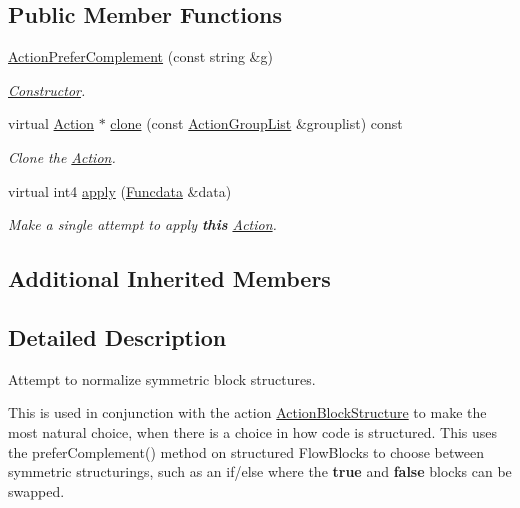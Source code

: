 \subsection*{Public Member Functions}
\begin{DoxyCompactItemize}
\item 
\mbox{\hyperlink{class_action_prefer_complement_a39c88a8ebde13877b979fe09eaaf7472}{Action\+Prefer\+Complement}} (const string \&g)
\begin{DoxyCompactList}\small\item\em \mbox{\hyperlink{class_constructor}{Constructor}}. \end{DoxyCompactList}\item 
virtual \mbox{\hyperlink{class_action}{Action}} $\ast$ \mbox{\hyperlink{class_action_prefer_complement_a39b68f861f1e99b1412cf78f5dff888a}{clone}} (const \mbox{\hyperlink{class_action_group_list}{Action\+Group\+List}} \&grouplist) const
\begin{DoxyCompactList}\small\item\em Clone the \mbox{\hyperlink{class_action}{Action}}. \end{DoxyCompactList}\item 
virtual int4 \mbox{\hyperlink{class_action_prefer_complement_a88227ed0c02b56ff86ffae3a02f8eff4}{apply}} (\mbox{\hyperlink{class_funcdata}{Funcdata}} \&data)
\begin{DoxyCompactList}\small\item\em Make a single attempt to apply {\bfseries{this}} \mbox{\hyperlink{class_action}{Action}}. \end{DoxyCompactList}\end{DoxyCompactItemize}
\subsection*{Additional Inherited Members}


\subsection{Detailed Description}
Attempt to normalize symmetric block structures. 

This is used in conjunction with the action \mbox{\hyperlink{class_action_block_structure}{Action\+Block\+Structure}} to make the most natural choice, when there is a choice in how code is structured. This uses the prefer\+Complement() method on structured Flow\+Blocks to choose between symmetric structurings, such as an if/else where the {\bfseries{true}} and {\bfseries{false}} blocks can be swapped. 

